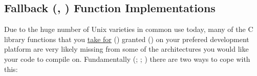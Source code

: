 \subsection[Fallback Function Implementations]{Fallback ({\MlQ{}}, {\MaQ{}}) Function Implementations}\label{ffi}


Due to the huge number of Unix varieties in common use today, many of the C 
library functions that you \underline{take for} ({\McQ{}}) granted ({\MfQ{}}) on 
your prefered development platform are very likely missing from some of 
the architectures you would like your code to compile on.
Fundamentally ({\MeQ{}}; {\MgQ{}}; {\McQ{}}) there are two ways to cope with this: 

